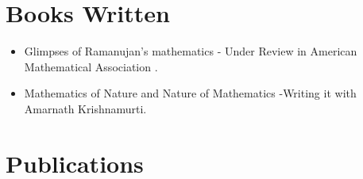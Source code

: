 \documentclass[]{deedy-resume-openfont}
\begin{document}
\section{Books Written}
\hline
\vspace{\topsep}
\begin{itemize}
\item Glimpses of Ramanujan’s mathematics - Under Review in American Mathematical Association .
\item Mathematics of Nature and Nature of Mathematics -Writing it with Amarnath Krishnamurti.
\end{itemize}
\sectionsep


\section{Publications}
\hline
\vspace{\topsep}
\end{document}
